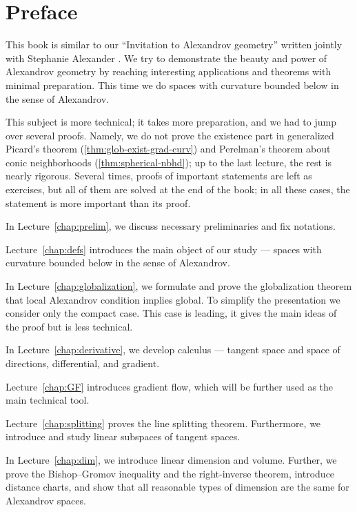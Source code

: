 \chapter*{Preface}

This book is similar to our ``Invitation to Alexandrov geometry'' written jointly with Stephanie Alexander \cite{alexander-kapovitch-petrunin-2019}.
We try to demonstrate the beauty and power of Alexandrov geometry by reaching interesting applications and theorems with minimal preparation.
This time we do spaces with curvature bounded below in the sense of Alexandrov.

This subject is more technical; it takes more preparation, and we had to jump over several proofs.
Namely, we do not prove the existence part in generalized Picard's theorem (\ref{thm:glob-exist-grad-curv})
and Perelman's theorem about conic neighborhoods (\ref{thm:spherical-nbhd});
up to the last lecture, the rest is nearly rigorous.
Several times, proofs of important statements are left as exercises,
but all of them are solved at the end of the book;
in all these cases, the statement is more important than its proof.


\medskip

In Lecture~\ref{chap:prelim}, we discuss necessary preliminaries and fix notations.

Lecture~\ref{chap:defs} introduces the main object of our study --- spaces with curvature bounded below in the sense of Alexandrov.

In Lecture~\ref{chap:globalization}, we formulate and prove the globalization theorem that local Alexandrov condition implies global.
To simplify the presentation we consider only the compact case.
This case is leading, it gives the main ideas of the proof but is less technical.

In Lecture~\ref{chap:derivative}, we develop calculus --- tangent space and space of directions, differential, and gradient.

Lecture~\ref{chap:GF} introduces gradient flow, which will be further used as the main technical tool.

Lecture~\ref{chap:splitting} proves the line splitting theorem.
Furthermore, we introduce and study  linear subspaces of tangent spaces.

In Lecture~\ref{chap:dim}, we introduce linear dimension and volume.
Further, we prove the Bishop--Gromov inequality and the right-inverse theorem,
introduce  distance charts, and show that all reasonable types of dimension are the 
same for Alexandrov spaces.

